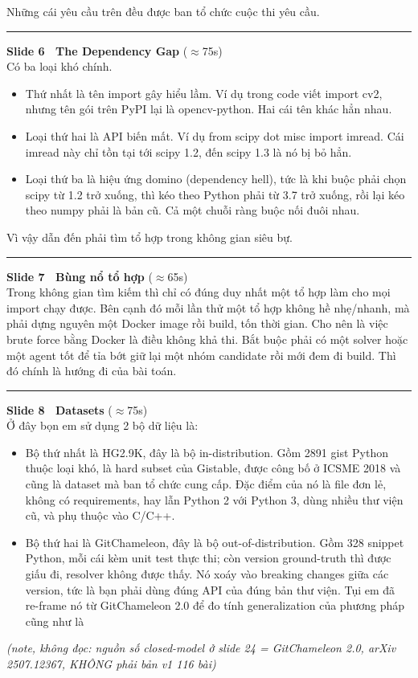 \documentclass[11pt]{article}
\newcommand{\stagenote}[1]{{\small\itshape\color{gray}#1}}
\newcommand{\slidehead}[3]{%
  \vspace{1.05em}\par\noindent
  {\color{accent}\rule[-0.18em]{3pt}{1.05em}}\hspace{0.5em}%
  {\bfseries\large\color{navydeep}Slide #1 \textperiodcentered\ #2}%
  \hfill{\small\color{gray}(#3)}\\[0.25em]%
}
\begin{document}
Những cái yêu cầu trên đều được ban tổ chức cuộc thi yêu cầu.

\slidehead{6}{The Dependency Gap}{$\approx$75s}
Có ba loại khó chính.
\begin{itemize}
  \item Thứ nhất là tên import gây hiểu lầm. Ví dụ trong code viết import cv2, nhưng tên gói trên PyPI lại là opencv-python. Hai cái tên khác hẳn nhau.
  \item Loại thứ hai là API biến mất. Ví dụ from scipy dot misc import imread. Cái imread này chỉ tồn tại tới scipy 1.2, đến scipy 1.3 là nó bị bỏ hẳn.
  \item Loại thứ ba là hiệu ứng domino (dependency hell), tức là khi buộc phải chọn scipy từ 1.2 trở xuống, thì kéo theo Python phải từ 3.7 trở xuống, rồi lại kéo theo numpy phải là bản cũ. Cả một chuỗi ràng buộc nối đuôi nhau.
\end{itemize}
Vì vậy dẫn đến phải tìm tổ hợp trong không gian siêu bự.

\slidehead{7}{Bùng nổ tổ hợp}{$\approx$65s}
Trong không gian tìm kiếm thì chỉ có đúng duy nhất một tổ hợp làm cho mọi import chạy được. Bên cạnh đó mỗi lần thử một tổ hợp không hề nhẹ/nhanh, mà phải dựng nguyên một Docker image rồi build, tốn thời gian. Cho nên là việc brute force bằng Docker là điều không khả thi. Bắt buộc phải có một solver hoặc một agent tốt để tỉa bớt giữ lại một nhóm candidate rồi mới đem đi build. Thì đó chính là hướng đi của bài toán.

\slidehead{8}{Datasets}{$\approx$75s}
Ở đây bọn em sử dụng 2 bộ dữ liệu là:
\begin{itemize}
  \item Bộ thứ nhất là HG2.9K, đây là bộ in-distribution. Gồm 2891 gist Python thuộc loại khó, là hard subset của Gistable, được công bố ở ICSME 2018 và cũng là dataset mà ban tổ chức cung cấp. Đặc điểm của nó là file đơn lẻ, không có requirements, hay lẫn Python 2 với Python 3, dùng nhiều thư viện cũ, và phụ thuộc vào C/C++.
  \item Bộ thứ hai là GitChameleon, đây là bộ out-of-distribution. Gồm 328 snippet Python, mỗi cái kèm unit test thực thi; còn version ground-truth thì được giấu đi, resolver không được thấy. Nó xoáy vào breaking changes giữa các version, tức là bạn phải dùng đúng API của đúng bản thư viện. Tụi em đã re-frame nó từ GitChameleon 2.0 để đo tính generalization của phương pháp cũng như là
\end{itemize}
\stagenote{(note, không đọc: nguồn số closed-model ở slide 24 = GitChameleon 2.0, arXiv 2507.12367, KHÔNG phải bản v1 116 bài)}
\end{document}
